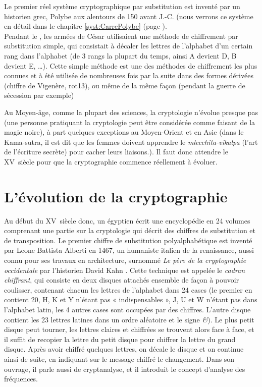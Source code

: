 Le premier réel système cryptographique par substitution est inventé
par un historien grec, Polybe aux alentours de 150 avant J.-C. (nous
verrons ce système en détail dans le chapitre \ref{syst:CarrePolybe} (page
\pageref{syst:CarrePolybe}). \\

\label{syst:ChiffreCesar}
Pendant le , les armées de César utilisaient une méthode de
chiffrement par substitution simple, qui consistait à décaler les
lettres de l'alphabet d'un certain rang dans l'alphabet (de 3 rangs la
plupart du temps, ainsi A devient D, B devient E, \dots). Cette simple
méthode est une des méthodes de chiffrement les plus connues et à été
utilisée de nombreuses fois par la suite dans des formes dérivées (chiffre de
Vigenère, rot13), ou même
de la même façon (pendant la guerre de sécession par exemple)

Au Moyen-âge, comme la plupart des sciences, la cryptologie n'évolue
presque pas (une personne pratiquant la cryptologie peut être
considérée comme faisant de la magie noire), à part quelques exceptions
au Moyen-Orient et en Asie (dans le Kama-sutra, il est dit que les
femmes doivent apprendre le \emph{mlecchita-vikalpa} (l'art de
l'écriture secrète) pour cacher leurs liaisons.). Il faut donc
attendre le XV\ieme~siècle pour que la cryptographie commence
réellement à évoluer. \\

\section{L'évolution de la cryptographie}
Au début du XV\ieme~siècle donc, un égyptien écrit une encyclopédie
en 24 volumes comprenant une partie sur la cryptologie qui décrit des
chiffres de substitution et de transposition. Le premier chiffre de
substitution polyalphabétique
est inventé par Leone Battista Alberti en 1467, un humaniste italien
de la renaissance, aussi connu pour ses travaux en architecture,
surnommé \emph{Le père de la cryptographie occidentale} par
l'historien David Kahn \cite{Codebreakers}. Cette technique est appelée
le \emph{cadran chiffrant}\label{syst:CadranChiffrant}, qui consiste
en deux disques attachés ensemble de façon à pouvoir coulisser,
contenant chacun les lettres de l'alphabet dans 24 cases (le premier
en contient 20, H, K et Y n'étant pas « indispensables », J, U et W
n'étant pas dans l'alphabet latin, les 4 autres cases sont occupées
par des chiffres. L'autre disque contient les 23 lettres latines dans
un ordre aléatoire et le signe \emph{\&}). Le plus petit disque peut tourner,
les lettres claires et chiffrées se trouvent alors face à face, et il
suffit de recopier la lettre du petit disque pour chiffrer la lettre
du grand disque. Après avoir chiffré quelques lettres, on décale le
disque et on continue ainsi de suite, en indiquant sur le message
chiffré le changement. Dans son ouvrage, il parle aussi de
cryptanalyse, et il introduit le concept d'analyse des
fréquences. \\

